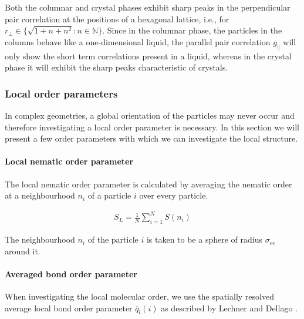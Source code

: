 Both the columnar and crystal phases exhibit sharp peaks in the perpendicular pair correlation at the positions of a hexagonal lattice, i.e., for $r_{\perp} \in \{ \sqrt{1+n+n^2}: n \in \mathbb{N}\}$. Since in the columnar phase, the particles in the columns behave like a one-dimensional liquid, the parallel pair correlation $g_\parallel$ will only show the short term correlations present in a liquid, whereas in the crystal phase it will exhibit the sharp peaks characteristic of crystals.

\subsubsection{Local order parameters}
In complex geometries, a global orientation of the particles may never occur and therefore investigating a local order parameter is necessary. In this section we will present a few order parameters with which we can investigate the local structure.
\paragraph {Local nematic order parameter}

The local nematic order parameter is calculated by averaging the nematic order at a neighbourhood $n_i$ of a particle $i$ over every particle.

\begin{align}
    S_L = \frac{1}{N}\displaystyle\sum_{i=1}^N  S(n_i)
\end{align}

The neighbourhood $n_i$ of the particle $i$ is taken to be a sphere of radius $\sigma_{ee}$ around it.

\paragraph{Averaged bond order parameter}

When investigating the local molecular order, we use the spatially resolved average local bond order parameter $\overline{q}_l(i)$ as described by Lechner and Dellago \cite{lechner2008accurate}.





